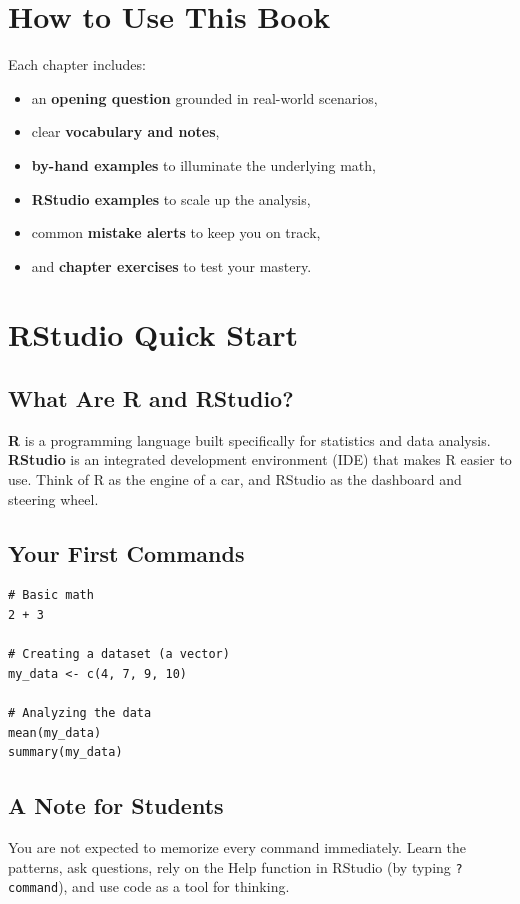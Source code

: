 \documentclass[11pt,openany]{book}
\begin{document}
\chapter*{How to Use This Book}
Each chapter includes:
\begin{itemize}
    \item an \textbf{opening question} grounded in real-world scenarios,
    \item clear \textbf{vocabulary and notes},
    \item \textbf{by-hand examples} to illuminate the underlying math,
    \item \textbf{RStudio examples} to scale up the analysis,
    \item common \textbf{mistake alerts} to keep you on track,
    \item and \textbf{chapter exercises} to test your mastery.
\end{itemize}

\chapter*{RStudio Quick Start}
\section*{What Are R and RStudio?}
\textbf{R} is a programming language built specifically for statistics and data analysis. \textbf{RStudio} is an integrated development environment (IDE) that makes R easier to use. Think of R as the engine of a car, and RStudio as the dashboard and steering wheel.

\section*{Your First Commands}
\begin{lstlisting}[style=rcode]
# Basic math
2 + 3

# Creating a dataset (a vector)
my_data <- c(4, 7, 9, 10)

# Analyzing the data
mean(my_data)
summary(my_data)
\end{lstlisting}

\section*{A Note for Students}
You are not expected to memorize every command immediately. Learn the patterns, ask questions, rely on the Help function in RStudio (by typing \texttt{?command}), and use code as a tool for thinking.
\end{document}
